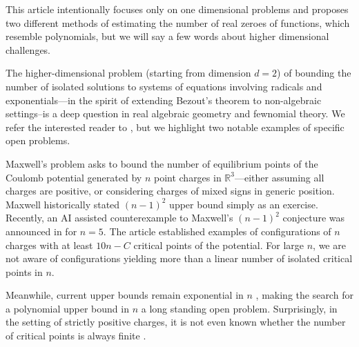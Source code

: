 \documentclass{article}
\begin{document}
This article intentionally focuses only on one dimensional problems and proposes two different methods of estimating the number of real zeroes of functions, which resemble polynomials, but we will say a few words about higher dimensional challenges. 



The higher-dimensional problem (starting from dimension $d=2$) of bounding the number of isolated solutions to systems of equations involving radicals and exponentials---in the spirit of extending Bezout's theorem to non-algebraic settings--is a deep question in real algebraic geometry and fewnomial theory. We refer the interested reader to \cite{ADK, GNS, AEH}, but we highlight two notable examples of specific open problems.

Maxwell's problem asks to bound the number of equilibrium points of the Coulomb potential generated by $n$ point charges in $\mathbb{R}^3$---either assuming all charges are positive, or considering charges of mixed signs in generic position. 
Maxwell historically stated $(n-1)^2$ upper bound simply as an exercise.
Recently, an AI assisted counterexample to Maxwell's $(n-1)^2$ conjecture was announced in \cite{ABK} for $n=5$.
The article \cite{ABK} established examples of configurations of $n$ charges with at least $10n-C$ critical points of the potential.
For large $n$, we are not aware of configurations yielding more than a linear number of isolated critical points in $n$.

Meanwhile, current upper bounds remain exponential in $n$ \cite{GNS}, making the search for a polynomial upper bound in $n$ a long standing open problem. Surprisingly, in the setting of strictly positive charges, it is not even known whether the number of critical points is always finite \cite{Eremenko2015}. 
\end{document}

